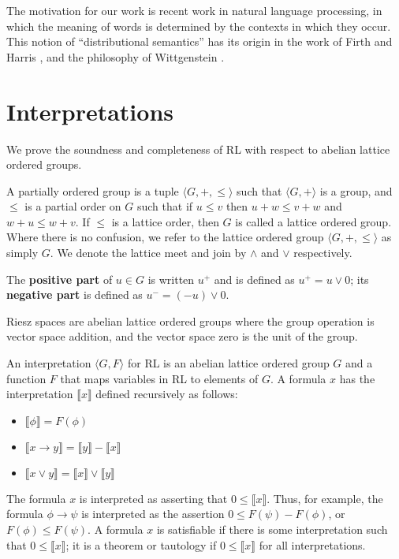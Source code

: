 \documentclass[preprint,leqno]{elsarticle}
\newcommand{\interp}[1]{\llbracket #1 \rrbracket}
\begin{document}
The motivation for our work is recent work in natural language
processing, in which the meaning of words is determined by the
contexts in which they occur. This notion of ``distributional
semantics'' has its origin in the work of Firth \cite{Firth:57} and
Harris \cite{Harris:68}, and the philosophy of Wittgenstein
\cite{Wittgenstein:53}.

\section{Interpretations}

We prove the soundness and completeness of RL with respect to
abelian lattice ordered groups.

\begin{definition}
  A partially ordered group is a tuple $\langle G, +, \le\rangle$ such
  that $\langle G, +\rangle$ is a group, and $\le$ is a partial order
  on $G$ such that if $u \le v$ then $u + w \le v + w$ and $w + u \le
  w + v$. If $\le$ is a lattice order, then $G$ is called a lattice
  ordered group. Where there is no confusion, we refer to the lattice
  ordered group $\langle G, +, \le\rangle$ as simply $G$. We denote
  the lattice meet and join by $\land$ and $\lor$ respectively.

  The \textbf{positive part} of $u\in G$ is written $u^+$ and is defined
  as $u^+ = u\lor 0$; its \textbf{negative part} is defined as $u^- =
  (-u)\lor 0$.
\end{definition}

Riesz spaces are abelian lattice ordered groups where the group
operation is vector space addition, and the vector space zero is the
unit of the group.

An interpretation $\langle G, F\rangle$ for RL is an abelian lattice
ordered group $G$ and a function $F$ that maps variables in RL to
elements of $G$. A formula $x$ has the interpretation $\interp{x}$
defined recursively as follows:
\begin{itemize}
\item $\interp{\phi} = F(\phi)$
\item $\interp{x \rightarrow y} = \interp{y} - \interp{x}$
\item $\interp{x \lor y} = \interp{x} \lor \interp{y}$
\end{itemize}
The formula $x$ is interpreted as asserting that $0 \le
\interp{x}$. Thus, for example, the formula $\phi \rightarrow \psi$ is
interpreted as the assertion $0 \le F(\psi) - F(\phi)$, or $F(\phi)
\le F(\psi)$. A formula $x$ is satisfiable if there is some
interpretation such that $0 \le \interp{x}$; it is a theorem or
tautology if $0 \le \interp{x}$ for all interpretations.
\end{document}
